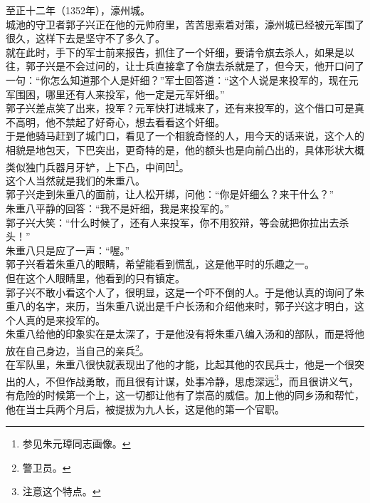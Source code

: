 	\begin{multicols}{\theparacolNo}
\fi
至正十二年（1352年），濠州城。\\

城池的守卫者郭子兴正在他的元帅府里，苦苦思索着对策，濠州城已经被元军围了很久，这样下去是坚守不了多久了。\\

就在此时，手下的军士前来报告，抓住了一个奸细，要请令旗去杀人，如果是以往，郭子兴是不会过问的，让士兵直接拿了令旗去杀就是了，但今天，他开口问了一句：“你怎么知道那个人是奸细？”军士回答道：“这个人说是来投军的，现在元军围困，哪里还有人来投军，他一定是元军奸细。”\\

郭子兴差点笑了出来，投军？元军快打进城来了，还有来投军的，这个借口可是真不高明，他不禁起了好奇心，想去看看这个奸细。\\

于是他骑马赶到了城门口，看见了一个相貌奇怪的人，用今天的话来说，这个人的相貌是地包天，下巴突出，更奇特的是，他的额头也是向前凸出的，具体形状大概类似独门兵器月牙铲，上下凸，中间凹\footnote{参见朱元璋同志画像。}。\\

这个人当然就是我们的朱重八。\\

郭子兴走到朱重八的面前，让人松开绑，问他：“你是奸细么？来干什么？”\\

朱重八平静的回答：“我不是奸细，我是来投军的。”\\

郭子兴大笑：“什么时候了，还有人来投军，你不用狡辩，等会就把你拉出去杀头！”\\

朱重八只是应了一声：“喔。”\\

郭子兴看着朱重八的眼睛，希望能看到慌乱，这是他平时的乐趣之一。\\

但在这个人眼睛里，他看到的只有镇定。\\

郭子兴不敢小看这个人了，很明显，这是一个吓不倒的人。于是他认真的询问了朱重八的名字，来历，当朱重八说出是千户长汤和介绍他来时，郭子兴这才明白，这个人真的是来投军的。\\

朱重八给他的印象实在是太深了，于是他没有将朱重八编入汤和的部队，而是将他放在自己身边，当自己的亲兵\footnote{警卫员。}。\\

在军队里，朱重八很快就表现出了他的才能，比起其他的农民兵士，他是一个很突出的人，不但作战勇敢，而且很有计谋，处事冷静，思虑深远\footnote{注意这个特点。}，而且很讲义气，有危险的时候第一个上，这一切都让他有了崇高的威信。加上他的同乡汤和帮忙，他在当士兵两个月后，被提拔为九人长，这是他的第一个官职。\\


\end{multicols}
